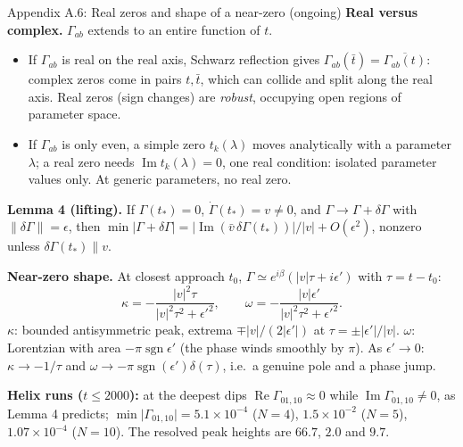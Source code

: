 \documentclass[aspectratio=169,11pt]{beamer}
\begin{document}
\begin{frame}{Appendix A.6: Real zeros and shape of a near-zero (ongoing)}
\footnotesize
\textbf{Real versus complex.} $\Gamma_{ab}$ extends to an entire function of $t$.
\begin{itemize}\setlength\itemsep{2pt}
\item If $\Gamma_{ab}$ is real on the real axis, Schwarz reflection gives $\Gamma_{ab}(\bar t)=\overline{\Gamma_{ab}(t)}$: complex zeros come in pairs $t,\bar t$, which can collide and split along the real axis. Real zeros (sign changes) are \emph{robust}, occupying open regions of parameter space.
\item If $\Gamma_{ab}$ is only even, a simple zero $t_k(\lambda)$ moves analytically with a parameter $\lambda$; a real zero needs $\operatorname{Im}t_k(\lambda)=0$, one real condition: isolated parameter values only. At generic parameters, no real zero.
\end{itemize}
\textbf{Lemma 4 (lifting).} If $\Gamma(t_*)=0$, $\dot\Gamma(t_*)=v\neq0$, and $\Gamma\to\Gamma+\delta\Gamma$ with $\lVert\delta\Gamma\rVert=\epsilon$, then $\min\lvert\Gamma+\delta\Gamma\rvert=\lvert\operatorname{Im}(\bar v\,\delta\Gamma(t_*))\rvert/\lvert v\rvert+O(\epsilon^2)$, nonzero unless $\delta\Gamma(t_*)\parallel v$.
\medskip

\textbf{Near-zero shape.} At closest approach $t_0$, $\Gamma\simeq e^{i\beta}(\lvert v\rvert\tau+i\epsilon')$ with $\tau=t-t_0$:
\[
\kappa=-\frac{\lvert v\rvert^2\tau}{\lvert v\rvert^2\tau^2+\epsilon'^2},\qquad
\omega=-\frac{\lvert v\rvert\epsilon'}{\lvert v\rvert^2\tau^2+\epsilon'^2}.
\]
$\kappa$: bounded antisymmetric peak, extrema $\mp\lvert v\rvert/(2\lvert\epsilon'\rvert)$ at $\tau=\pm\lvert\epsilon'\rvert/\lvert v\rvert$. $\omega$: Lorentzian with area $-\pi\operatorname{sgn}\epsilon'$ (the phase winds smoothly by $\pi$). As $\epsilon'\to0$: $\kappa\to-1/\tau$ and $\omega\to-\pi\operatorname{sgn}(\epsilon')\delta(\tau)$, i.e.\ a genuine pole and a phase jump.
\medskip

\textbf{Helix runs ($t\le2000$):} at the deepest dips $\operatorname{Re}\Gamma_{01,10}\approx0$ while $\operatorname{Im}\Gamma_{01,10}\neq0$, as Lemma 4 predicts; $\min\lvert\Gamma_{01,10}\rvert=5.1\times10^{-4}$ ($N=4$), $1.5\times10^{-2}$ ($N=5$), $1.07\times10^{-4}$ ($N=10$). The resolved peak heights are $66.7$, $2.0$ and $9.7$.
\end{frame}
\end{document}
